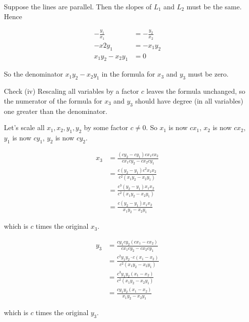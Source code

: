 \documentclass[9pt]{article}
\begin{document}
Suppose the lines are parallel. Then the slopes of $L_1$ and $L_2$ must be the same. Hence

\begin{align*}
  -\frac{y_1}{x_1} &= -\frac{y_2}{x_2} \\
  -x2 y_1 &= -x_1 y_2 \\
  x_1 y_2 - x_2 y_1 &= 0
\end{align*}

So the denominator $x_1 y_2 - x_2 y_1$ in the formula for $x_3$ and $y_3$ must be zero.

\begin{tcolorbox}
  Check (iv) Rescaling all variables by a factor $c$ leaves the formula unchanged, so the numerator of the formula for $x_3$ and $y_3$ should have degree (in all variables) one greater than the denominator.
\end{tcolorbox}

Let's scale all $x_1, x_2, y_1, y_2$ by some factor $c \neq 0$. So $x_1$ is now $c x_1$, $x_2$ is now $c x_2$, $y_1$ is now $c y_1$, $y_2$ is now $c y_2$.

\begin{align*}
  x_3 &= \frac{(c y_2 - c y_1) c x_1 c x_2}{c x_1 c y_2 - c x_2 c y_1} \\
      &= \frac{c (y_2 - y_1) c^2 x_1 x_2}{c^2(x_1 y_2 - x_2 y_1)} \\
      &= \frac{c^3 (y_2 - y_1) x_1 x_2}{c^2(x_1 y_2 - x_2 y_1)} \\
      &= \frac{c (y_2 - y_1) x_1 x_2}{x_1 y_2 - x_2 y_1}
\end{align*}

which is $c$ times the original $x_3$.

\begin{align*}
  y_3 &= \frac{c y_1 c y_2 (c x_1 - c x_2)}{c x_1 c y_2 - c x_2 c y_1} \\
      &= \frac{c^2 y_1 y_2 \cdot c (x_1 - x_2)}{c^2 (x_1 y_2 - x_2 y_1)} \\
      &= \frac{c^3 y_1 y_2 (x_1 - x_2)}{c^2 (x_1 y_2 - x_2 y_1)} \\
      &= \frac{c y_1 y_2 (x_1 - x_2)}{x_1 y_2 - x_2 y_1}
\end{align*}

which is $c$ times the original $y_3$.
\end{document}
